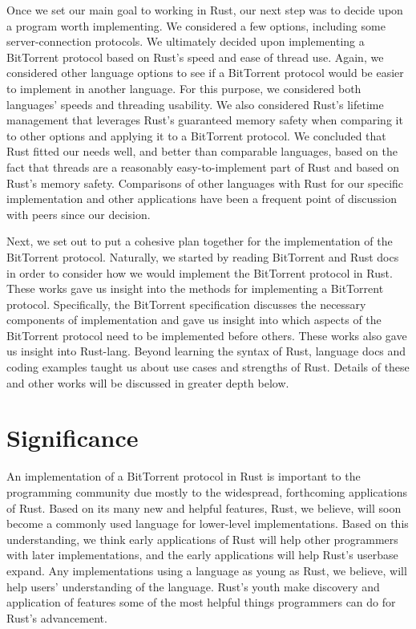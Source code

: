 \documentclass{acm_proc_article-sp}
\begin{document}
Once we set our main goal to working in Rust, our next step was to decide upon a program worth implementing.  We considered a few options, including some server-connection protocols.  We ultimately decided upon implementing a BitTorrent protocol based on Rust's speed and ease of thread use.  Again, we considered other language options to see if a BitTorrent protocol would be easier to implement in another language.  For this purpose, we considered both languages' speeds and threading usability.  We also considered Rust's lifetime management that leverages Rust's guaranteed memory safety when comparing it to other options and applying it to a BitTorrent protocol.  We concluded that Rust fitted our needs well, and better than comparable languages, based on the fact that threads are a reasonably easy-to-implement part of Rust and based on Rust's memory safety.  Comparisons of other languages with Rust for our specific implementation and other applications have been a frequent point of discussion with peers since our decision.

Next, we set out to put a cohesive plan together for the implementation of the BitTorrent protocol.  Naturally, we started by reading BitTorrent and Rust docs in order to consider how we would implement the BitTorrent protocol in Rust.  These works gave us insight into the methods for implementing a BitTorrent protocol.  Specifically, the BitTorrent specification discusses the necessary components of implementation and gave us insight into which aspects of the BitTorrent protocol need to be implemented before others.  These works also gave us insight into Rust-lang.  Beyond learning the syntax of Rust, language docs and coding examples taught us about use cases and strengths of Rust.  Details of these and other works will be discussed in greater depth below.


\section{Significance}

An implementation of a BitTorrent protocol in Rust is important to the programming community due mostly to the widespread, forthcoming applications of Rust.  Based on its many new and helpful features, Rust, we believe, will soon become a commonly used language for lower-level implementations.  Based on this understanding, we think early applications of Rust will help other programmers with later implementations, and the early applications will help Rust's userbase expand.  Any implementations using a language as young as Rust, we believe, will help users' understanding of the language.  Rust's youth make discovery and application of features some of the most helpful things programmers can do for Rust's advancement.
\end{document}
